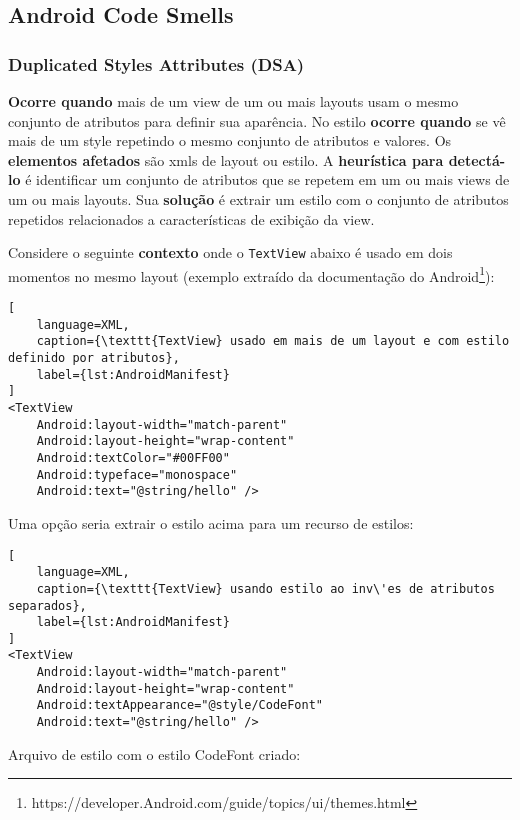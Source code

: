 
\subsection{Android Code Smells}
\label{sub:Android-code-smells}

\subsubsection{Duplicated Styles Attributes (DSA)}

\textbf{Ocorre quando} mais de um view de um ou mais layouts usam o mesmo conjunto de atributos para definir sua apar\^encia. No estilo \textbf{ocorre quando} se v\^e mais de um style repetindo o mesmo conjunto de atributos e valores. Os \textbf{elementos afetados} s\~ao xmls de layout ou estilo. A \textbf{heur\'istica para detect\'a-lo} \'e identificar um conjunto de atributos que se repetem em um ou mais views de um ou mais layouts. Sua \textbf{solu\c{c}\~ao} \'e extrair um estilo com o conjunto de atributos repetidos relacionados a caracter\'isticas de exibi\c{c}\~ao da view. 

Considere o seguinte \textbf{contexto} onde o \texttt{TextView} abaixo \'e usado em dois momentos no mesmo layout (exemplo extra\'ido da documenta\c{c}\~ao do Android\footnote{https://developer.Android.com/guide/topics/ui/themes.html}):

\begin{lstlisting}[
	language=XML, 
	caption={\texttt{TextView} usado em mais de um layout e com estilo definido por atributos}, 
	label={lst:AndroidManifest}
]
<TextView
    Android:layout-width="match-parent"
    Android:layout-height="wrap-content"
    Android:textColor="#00FF00"
    Android:typeface="monospace"
    Android:text="@string/hello" />
\end{lstlisting}

Uma op\c{c}\~ao seria extrair o estilo acima para um recurso de estilos:

\begin{lstlisting}[
	language=XML, 
	caption={\texttt{TextView} usando estilo ao inv\'es de atributos separados}, 
	label={lst:AndroidManifest}
]
<TextView
    Android:layout-width="match-parent"
    Android:layout-height="wrap-content"
    Android:textAppearance="@style/CodeFont"
    Android:text="@string/hello" />
\end{lstlisting}

Arquivo de estilo com o estilo CodeFont criado:

